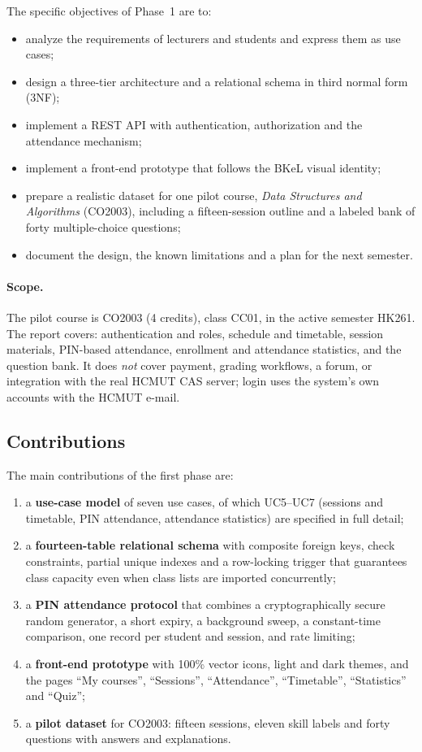 The specific objectives of Phase~1 are to:

\begin{itemize}
    \item analyze the requirements of lecturers and students and express them as use cases;
    \item design a three-tier architecture and a relational schema in third normal form (3NF);
    \item implement a REST API with authentication, authorization and the attendance mechanism;
    \item implement a front-end prototype that follows the BKeL visual identity;
    \item prepare a realistic dataset for one pilot course, \emph{Data Structures and Algorithms} (CO2003), including a fifteen-session outline and a labeled bank of forty multiple-choice questions;
    \item document the design, the known limitations and a plan for the next semester.
\end{itemize}

\paragraph{Scope.} The pilot course is CO2003 (4 credits), class CC01, in the active semester HK261. The report covers: authentication and roles, schedule and timetable, session materials, PIN-based attendance, enrollment and attendance statistics, and the question bank. It does \emph{not} cover payment, grading workflows, a forum, or integration with the real HCMUT CAS server; login uses the system's own accounts with the HCMUT e-mail.

\subsection{Contributions}

The main contributions of the first phase are:

\begin{enumerate}
    \item a \textbf{use-case model} of seven use cases, of which UC5--UC7 (sessions and timetable, PIN attendance, attendance statistics) are specified in full detail;
    \item a \textbf{fourteen-table relational schema} with composite foreign keys, check constraints, partial unique indexes and a row-locking trigger that guarantees class capacity even when class lists are imported concurrently;
    \item a \textbf{PIN attendance protocol} that combines a cryptographically secure random generator, a short expiry, a background sweep, a constant-time comparison, one record per student and session, and rate limiting;
    \item a \textbf{front-end prototype} with 100\% vector icons, light and dark themes, and the pages ``My courses'', ``Sessions'', ``Attendance'', ``Timetable'', ``Statistics'' and ``Quiz'';
    \item a \textbf{pilot dataset} for CO2003: fifteen sessions, eleven skill labels and forty questions with answers and explanations.
\end{enumerate}

